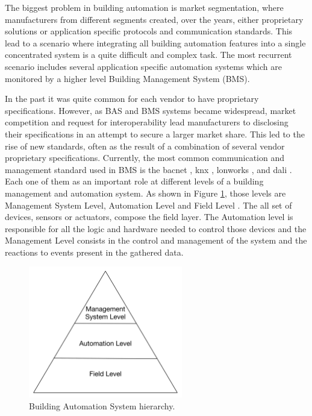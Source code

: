 The biggest problem in building automation is market segmentation, where manufacturers from different segments created, over the years, either proprietary solutions or application specific protocols and communication standards.  This lead to a scenario where integrating all building automation features into a single concentrated system is a quite  difficult and complex task. The most recurrent scenario includes several application specific automation systems which are monitored by a higher level Building Management System (BMS).

In the past it was quite common for each vendor to have proprietary specifications. However, as BAS and BMS systems became widespread, market competition and request for interoperability lead manufacturers to disclosing their specifications in an attempt to secure a larger market share. This led to the rise of new standards, often as the result of a combination of several vendor proprietary specifications. Currently, the most common communication and management standard used in BMS is the \acf{bacnet} \cite{bacnet}, \acf{knx} \cite{knx}, \acf{lonworks} \cite{EchelonCorporation2009}, and \acf{dali} \cite{dali}. Each one of them as an important role at different levels of a building management and automation system. As shown in Figure \ref{fig:hierarchy}, those levels are Management System Level, Automation Level and Field Level \cite{Iwayemi2011}. The all set of devices, sensors or actuators, compose the field layer. The Automation level is responsible for all the logic and hardware needed to control those devices and the Management Level consists in the control and management of the system and the reactions to events present in the gathered data.

\begin{figure}[H]
	\centering
	\includegraphics[width=0.6\textwidth]{figures/hierarchy.png}
	\caption{Building Automation System hierarchy. }
	\label{fig:hierarchy}
\end{figure}

